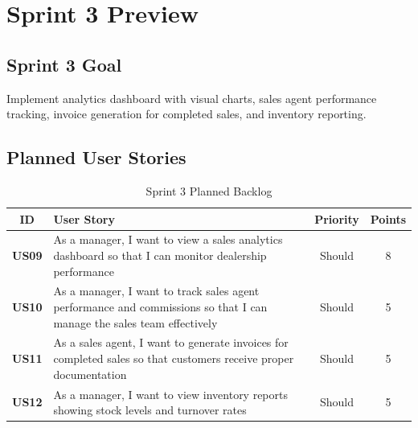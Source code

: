 \documentclass[12pt,a4paper]{article}
\newcommand{\thead}[1]{\textbf{\color{white}#1}}
\begin{document}
\section{Sprint 3 Preview}

\subsection{Sprint 3 Goal}

Implement analytics dashboard with visual charts, sales agent performance tracking, invoice generation for completed sales, and inventory reporting.

\subsection{Planned User Stories}

\begin{table}[H]
\centering
\renewcommand{\arraystretch}{1.3}
\footnotesize
\begin{tabularx}{\textwidth}{|c|Y|c|c|}
\hline
{} \thead{ID} & \thead{User Story} & \thead{Priority} & \thead{Points} \\
\hline
\textbf{US09} & As a manager, I want to view a sales analytics dashboard so that I can monitor dealership performance & Should & 8 \\
\hline
{}
\textbf{US10} & As a manager, I want to track sales agent performance and commissions so that I can manage the sales team effectively & Should & 5 \\
\hline
\textbf{US11} & As a sales agent, I want to generate invoices for completed sales so that customers receive proper documentation & Should & 5 \\
\hline
{}
\textbf{US12} & As a manager, I want to view inventory reports showing stock levels and turnover rates & Should & 5 \\
\hline
\end{tabularx}
\caption{Sprint 3 Planned Backlog}
\end{table}
\end{document}

